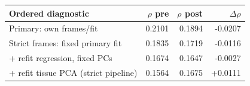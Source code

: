 \begin{tabular}{lrrr}
\toprule
Ordered diagnostic & $\rho$ pre & $\rho$ post & $\Delta\rho$ \\
\midrule
Primary: own frames/fit & 0.2101 & 0.1894 & -0.0207 \\
Strict frames: fixed primary fit & 0.1835 & 0.1719 & -0.0116 \\
+ refit regression, fixed PCs & 0.1674 & 0.1647 & -0.0027 \\
+ refit tissue PCA (strict pipeline) & 0.1564 & 0.1675 & +0.0111 \\
\bottomrule
\end{tabular}
